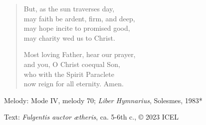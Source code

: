 \hymn



\setlength{\leftmargini}{2em}
\begin{verse}
But, as the sun traverses day,\\
may faith be ardent, firm, and deep,\\
may hope incite to promised good,\\
may charity wed us to Christ.

Most loving Father, hear our prayer,\\
and you, O Christ coequal Son,\\
who with the Spirit Paraclete\\
now reign for all eternity. Amen.
\end{verse}
\setlength{\leftmargini}{\defleftmargini}

\begin{hymnsource}
Melody: Mode IV, melody 70; \emph{Liber Hymnarius}, Solesmes, 1983*

Text: \emph{Fulgentis auctor ætheris}, ca. 5-6th c., © 2023 ICEL
\end{hymnsource}
